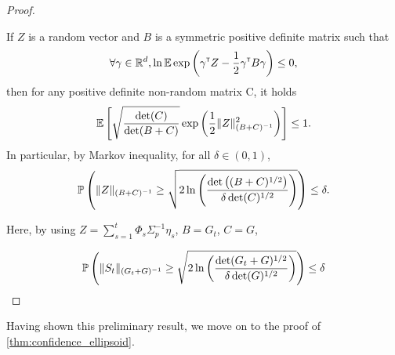 \documentclass{article}
\begin{document}
\begin{proof}
\begin{lemma}
If $Z$ is a random vector and $B$ is a symmetric positive definite matrix such that
\[\forall \gamma\in\mathbb{R}^d, \ln \operatorname*{\mathbb{E}} \exp \left(\gamma^{\mathsf{\scriptscriptstyle T}} Z -\frac{1}{2} \gamma^{\mathsf{\scriptscriptstyle T}} B \gamma \right)\leq 0,\]
then for any positive definite non-random matrix C, it holds
\[\operatorname*{\mathbb{E}}\left[ \sqrt{\frac{\det(C)}{\det(B+C)} } \exp\left( \frac{1}{2}\|Z\|^2_{(B+C)^{-1}}\right)\right]\leq 1. \] 
In particular, by Markov inequality, for all $\delta\in(0,1)$, 
\[\mathbb{P}\left(\|Z\|_{(B+C)^{-1}} \geq \sqrt{2\ln \left(\frac{\det \left((B+C)^{1/2}\right)}{\delta\det(C)^{1/2}}\right)}\right)\leq \delta.\]
\end{lemma}

Here, by using $Z = \sum_{s=1}^t\Phi_s\Sigma_p^{-1}\eta_s$, $B=G_t$, $C=G$,

\[
\mathbb{P}\left(\| S_t \|_{(G_t+G)^{-1}} \geq \sqrt{2\ln \left(\frac{\det(G_t+G)^{1/2}}{\delta\det(G)^{1/2}}\right)}\right) \leq \delta
\]

\end{proof}

Having shown this preliminary result, we move on to the proof of \autoref{thm:confidence_ellipsoid}.
\end{document}
